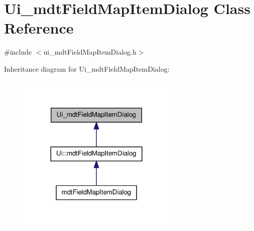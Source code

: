 \hypertarget{class_ui__mdt_field_map_item_dialog}{\section{Ui\-\_\-mdt\-Field\-Map\-Item\-Dialog Class Reference}
\label{class_ui__mdt_field_map_item_dialog}
}


{\ttfamily \#include $<$ui\-\_\-mdt\-Field\-Map\-Item\-Dialog.\-h$>$}



Inheritance diagram for Ui\-\_\-mdt\-Field\-Map\-Item\-Dialog\-:
\nopagebreak
\begin{figure}[H]
\begin{center}
\leavevmode
\includegraphics[width=216pt]{class_ui__mdt_field_map_item_dialog__inherit__graph}
\end{center}
\end{figure}


